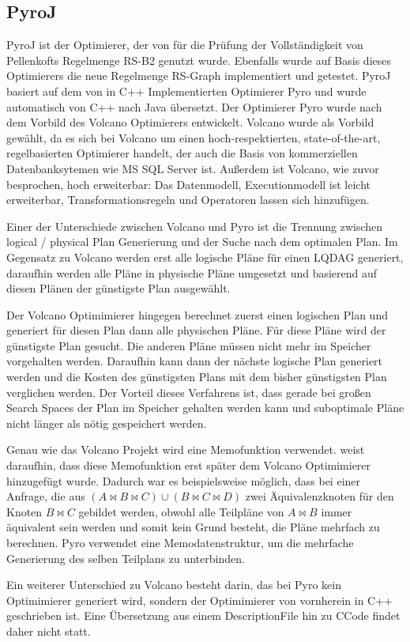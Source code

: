 \subsection{PyroJ}
PyroJ ist der Optimierer, der von \cite{} für die Prüfung der Vollständigkeit von Pellenkofts Regelmenge RS-B2 genutzt wurde. Ebenfalls wurde auf Basis dieses Optimierers die neue Regelmenge RS-Graph implementiert und getestet. 
PyroJ basiert auf dem von \cite{roy2001multi} in C++ Implementierten Optimierer Pyro und wurde automatisch von C++ nach Java übersetzt. Der Optimierer Pyro wurde nach dem Vorbild des Volcano Optimierers entwickelt. Volcano wurde als Vorbild gewählt, da es sich bei Volcano um einen hoch-respektierten, state-of-the-art, regelbasierten Optimierer handelt, der auch die Basis von kommerziellen Datenbanksytemen wie MS SQL Server ist. Außerdem ist Volcano, wie zuvor besprochen, hoch erweiterbar: Das Datenmodell, Executionmodell ist leicht erweiterbar, Transformationsregeln und Operatoren lassen sich hinzufügen. 

Einer der Unterschiede zwischen Volcano und Pyro ist die Trennung zwischen logical / physical Plan Generierung und der Suche nach dem optimalen Plan. Im Gegensatz zu Volcano werden erst alle logische Pläne für einen \ac{LQDAG} generiert, daraufhin werden alle Pläne in physische Pläne umgesetzt und basierend auf diesen Plänen der günstigste Plan ausgewählt.

Der Volcano Optimimierer hingegen berechnet zuerst einen logischen Plan und generiert für diesen Plan dann alle physischen Pläne. Für diese Pläne wird der günstigste Plan gesucht. Die anderen Pläne müssen nicht mehr im Speicher vorgehalten werden. Daraufhin kann dann der nächste logische Plan generiert werden und die Kosten des günstigsten Plans mit dem bisher günstigsten Plan verglichen werden. Der Vorteil dieses Verfahrens ist, dass gerade bei großen Search Spaces der Plan im Speicher gehalten werden kann und suboptimale Pläne nicht länger als nötig gespeichert werden.

Genau wie das Volcano Projekt wird eine Memofunktion verwendet. \cite{roy2001multi} weist daraufhin, dass diese Memofunktion erst später dem Volcano Optimimierer hinzugefügt wurde. Dadurch war es beispielsweise möglich, dass bei einer Anfrage, die aus $(A \Join B \Join C) \cup (B \Join C \Join D)$ zwei Äquivalenzknoten für den Knoten $B \Join C$ gebildet werden, obwohl alle Teilpläne von $A \Join B$ immer äquivalent sein werden und somit kein Grund besteht, die Pläne mehrfach zu berechnen. Pyro verwendet eine Memodatenstruktur, um die mehrfache Generierung des selben Teilplans zu unterbinden.

Ein weiterer Unterschied zu Volcano besteht darin, das  bei Pyro kein Optimimierer generiert wird, sondern der Optimimierer von vornherein in C++ geschrieben ist. Eine Übersetzung aus einem Description\-File hin zu C\-Code findet daher nicht statt.

\subsection{}